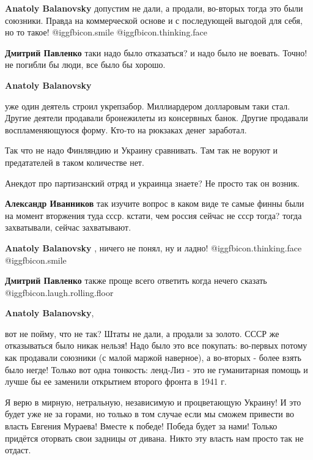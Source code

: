 \begin{itemize}
\begin{itemize}
\textbf{Anatoly Balanovsky} допустим не дали, а продали, во-вторых тогда это были союзники. Правда на коммерческой основе и с последующей выгодой для себя, но то такое! @igg{fbicon.smile}  @igg{fbicon.thinking.face} 

\textbf{Дмитрий Павленко} таки надо было отказаться? и надо было не воевать. Точно! не погибли бы люди, все было бы хорошо.

\textbf{Anatoly Balanovsky} 

уже один деятель строил укрепзабор. Миллиардером долларовым таки стал. Другие
деятели продавали бронежилеты из консервных банок. Другие продавали
воспламеняющуюся форму. Кто-то на рюкзаках денег заработал.

Так что не надо Финляндию и Украину сравнивать. Там так не воруют и
предатателей в таком количестве нет.

Анекдот про партизанский отряд и украинца знаете? Не просто так он возник.


\textbf{Александр Иванников} так изучите вопрос в каком виде те самые финны были на момент вторжения туда ссср.
кстати, чем россия сейчас не ссср тогда? тогда захватывали, сейчас захватывают.

\textbf{Anatoly Balanovsky} , ничего не понял, ну и ладно! @igg{fbicon.thinking.face}  @igg{fbicon.smile} 

\textbf{Дмитрий Павленко} также проще всего ответить когда нечего сказать  @igg{fbicon.laugh.rolling.floor} 

\textbf{Anatoly Balanovsky}, 

вот не пойму, что не так? Штаты не дали, а продали за золото. СССР же
отказываться было никак нельзя! Надо было это все покупать: во-первых потому
как продавали союзники (с малой маржой наверное), а во-вторых - более взять
было негде! Только вот одна тонкость: ленд-Лиз - это не гуманитарная помощь и
лучше бы ее заменили открытием второго фронта в 1941 г.

\end{itemize} %


Я верю в мирную, нетральную, независимую и процветающую Украину! И это будет уже
не за горами, но только в том случае если мы сможем привести во власть Евгения
Мураева! Вместе к победе! Победа будет за нами! Только придётся оторвать свои
задницы от дивана. Никто эту власть нам просто так не отдаст.



\end{itemize}
